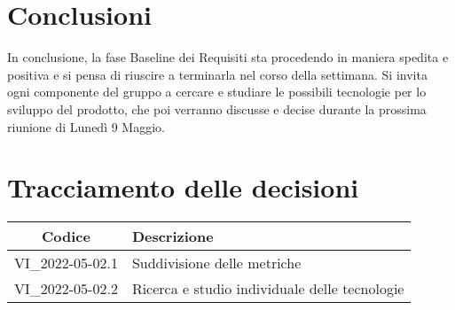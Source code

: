 \section{Conclusioni}
In conclusione, la fase Baseline dei Requisiti sta procedendo in maniera spedita e positiva e si pensa di riuscire a terminarla nel corso della settimana. Si invita ogni componente del gruppo a cercare e studiare 
le possibili tecnologie per lo sviluppo del prodotto, che poi verranno discusse e decise 
durante la prossima riunione di Lunedì 9 Maggio.
\newpage

\section*{Tracciamento delle decisioni}
	\renewcommand{\arraystretch}{1.8} %
	\begin{tabular}{ |c|l| }
		\hline
		\textbf{Codice} & \textbf{Descrizione} \\
		\hline
		VI\_2022-05-02.1 & Suddivisione delle metriche\\
		\hline
		VI\_2022-05-02.2 & Ricerca e studio individuale delle tecnologie\\
		\hline
	\end{tabular}